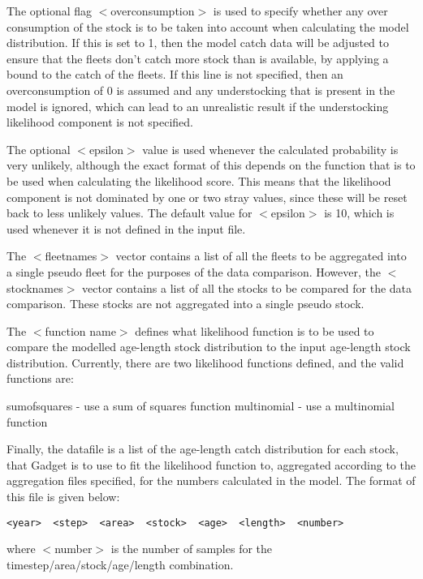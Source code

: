 \documentclass[10pt,twoside]{book}
\begin{document}
The optional flag $<$overconsumption$>$ is used to specify whether any over consumption of the stock is to be taken into account when calculating the model distribution.  If this is set to 1, then the model catch data will be adjusted to ensure that the fleets don't catch more stock than is available, by applying a bound to the catch of the fleets.  If this line is not specified, then an overconsumption of 0 is assumed and any understocking that is present in the model is ignored, which can lead to an unrealistic result if the understocking likelihood component is not specified.

\bigskip
The optional $<$epsilon$>$ value is used whenever the calculated probability is very unlikely, although the exact format of this depends on the function that is to be used when calculating the likelihood score.  This means that the likelihood component is not dominated by one or two stray values, since these will be reset back to less unlikely values.  The default value for $<$epsilon$>$ is 10, which is used whenever it is not defined in the input file.

\bigskip
The $<$fleetnames$>$ vector contains a list of all the fleets to be aggregated into a single pseudo fleet for the purposes of the data comparison.  However, the $<$stocknames$>$ vector contains a list of all the stocks to be compared for the data comparison.  These stocks are not aggregated into a single pseudo stock.

\bigskip
The $<$function name$>$ defines what likelihood function is to be used to compare the modelled age-length stock distribution to the input age-length stock distribution.  Currently, there are two likelihood functions defined, and the  valid functions are:

\bigskip
sumofsquares - use a sum of squares function\newline
multinomial - use a multinomial function

\bigskip
Finally, the datafile is a list of the age-length catch distribution for each stock, that Gadget is to use to fit the likelihood function to, aggregated according to the aggregation files specified, for the numbers calculated in the model.  The format of this file is given below:

{\small\begin{verbatim}
<year>  <step>  <area>  <stock>  <age>  <length>  <number>
\end{verbatim}}

where $<$number$>$ is the number of samples for the timestep/area/stock/age/length combination.
\end{document}
